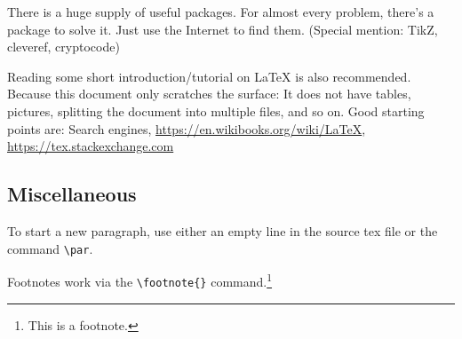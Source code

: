 \documentclass[11pt]{scrartcl}
\theoremstyle{plain} %
\theoremstyle{definition} %
\theoremstyle{remark} %
\begin{document}
There is a huge supply of useful packages.
For almost every problem, there's a package to solve it.
Just use the Internet to find them.
(Special mention: TikZ, cleveref, cryptocode)

Reading some short introduction/tutorial on \LaTeX{} is also recommended.
Because this document only scratches the surface:
It does not have tables, pictures, splitting the document into multiple files, and so on.
Good starting points are:
Search engines, \url{https://en.wikibooks.org/wiki/LaTeX}, \url{https://tex.stackexchange.com}



\subsection{Miscellaneous}
\label{subsec:misc}

To start a new paragraph, use either an empty line in the source tex file or the command \verb|\par|.

Footnotes work via the \verb|\footnote{}| command.\footnote{This is a footnote.}





\printbibliography{}
\end{document}

